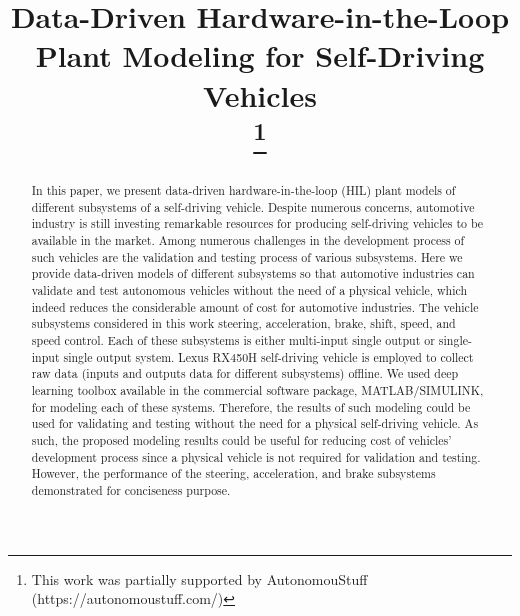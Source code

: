 \documentclass[conference]{IEEEtran}
\begin{document}
\title{Data-Driven Hardware-in-the-Loop Plant Modeling for Self-Driving Vehicles\\
\thanks{This work was partially supported by AutonomouStuff (https://autonomoustuff.com/)}
}


\author{
}

\maketitle

\begin{abstract}

  In this paper, we present data-driven hardware-in-the-loop (HIL) plant models of different subsystems of a self-driving vehicle. Despite numerous concerns, automotive industry is still investing remarkable resources for producing self-driving vehicles to be available in the market. Among numerous challenges in the development process of such vehicles are the validation and testing process of various subsystems. Here we provide data-driven models of different subsystems so that automotive industries can validate and test autonomous vehicles without the need of a physical vehicle, which indeed reduces the considerable amount of cost for automotive industries. The vehicle subsystems considered in this work steering, acceleration, brake, shift, speed, and speed control. Each of these subsystems is either multi-input single output or single-input single output system. Lexus RX450H self-driving vehicle is employed to collect raw data (inputs and outputs data for different subsystems) offline. We used deep learning toolbox available in the commercial software package, MATLAB/SIMULINK, for modeling each of these systems. Therefore, the results of such modeling could be used for validating and testing without the need for a physical self-driving vehicle. As such, the proposed modeling results could be useful for reducing cost of vehicles' development process since a physical vehicle is not required for validation and testing. However, the performance of the steering, acceleration, and brake subsystems demonstrated for conciseness purpose.

\end{abstract}
\end{document}
